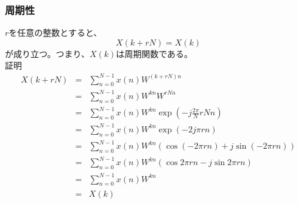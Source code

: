 \documentclass[a4paper]{jsarticle}
\begin{document}
\subsubsection{周期性}
$r$を任意の整数とすると、
\begin{equation}
X \left( k + rN \right) = X \left( k \right)
\end{equation}
が成り立つ。つまり、$X \left( k \right)$は周期関数である。\\
証明
\begin{eqnarray}
	X \left( k + rN \right) &=& \sum _{n = 0} ^{N - 1} x \left( n \right) W ^{\left( k + rN \right) n} \nonumber \\
	&=& \sum _{n = 0} ^{N - 1} x \left( n \right) W ^{kn} W ^{rNn} \nonumber \\
	&=& \sum _{n = 0} ^{N - 1} x \left( n \right) W ^{kn} \exp(-j \frac{2 \pi}{N}rNn) \nonumber \\
	&=& \sum _{n = 0} ^{N - 1} x \left( n \right) W ^{kn} \exp(-2j \pi rn) \nonumber \\
	&=& \sum _{n = 0} ^{N - 1} x \left( n \right) W ^{kn} \left( \cos \left( -2 \pi rn \right) + j \sin \left(-2 \pi rn \right) \right) \nonumber \\
	&=& \sum _{n = 0} ^{N - 1} x \left( n \right) W ^{kn} \left( \cos 2 \pi rn - j \sin 2 \pi rn \right) \nonumber \\
	&=& \sum _{n = 0} ^{N - 1} x \left( n \right) W ^{kn} \nonumber \\
	&=& X \left( k \right)
\end{eqnarray}
\end{document}
